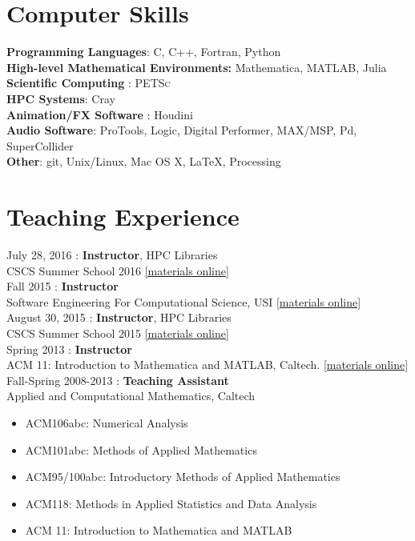 \documentclass[12pt]{article}
\begin{document}
\section*{Computer Skills}
\textbf{Programming Languages}: C, C++, Fortran, Python \\ 
\textbf{High-level Mathematical Environments:} Mathematica, MATLAB, Julia\\
\textbf{Scientific Computing} : \textsc{PETSc} \\
\textbf{HPC Systems}: Cray \\
\textbf{Animation/FX Software} : Houdini \\
\textbf{Audio Software}: ProTools, Logic, Digital Performer, MAX/MSP, Pd, SuperCollider\\
\textbf{Other}: git, Unix/Linux, Mac OS X, \LaTeX, Processing

\section*{Teaching Experience}
\label{sec:teaching}


\noindent July 28, 2016 : \textbf{Instructor}, HPC Libraries \\ 
CSCS Summer School 2016
\href{https://github.com/eth-cscs/SummerSchool2016}{[materials online]}\\

\noindent Fall 2015 : \textbf{Instructor} \\
Software Engineering For Computational Science, USI
\href{https://bitbucket.org/psanan/sefcs2015}{[materials online]}\\

\noindent August 30, 2015 : \textbf{Instructor}, HPC Libraries \\ 
CSCS Summer School 2015
\href{https://github.com/eth-cscs/SummerSchool2015/tree/master/libraries}{[materials online]}\\

\noindent Spring 2013 : \textbf{Instructor}\\
ACM 11: Introduction to Mathematica and MATLAB, Caltech.
\href{https://bitbucket.org/psanan/introduction-to-matlab-and-mathematica}{[materials online]}\\

\noindent Fall-Spring 2008-2013 : \textbf{Teaching Assistant}\\
Applied and Computational Mathematics, Caltech
\begin{itemize} \itemsep0em 
\item ACM106abc: Numerical Analysis
\item ACM101abc: Methods of Applied Mathematics
\item ACM95/100abc: Introductory Methods of Applied Mathematics 
\item ACM118: Methods in Applied Statistics and Data Analysis
\item ACM 11: Introduction to Mathematica and MATLAB
\end{itemize}
\end{document}
